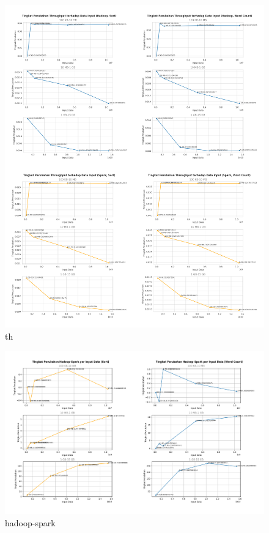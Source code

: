 \begin{figure}[h]
    \centering
    \includegraphics[width=1.1\textwidth]{figures/ch04/3-grup-th.png}
    \caption{th}
    \label{fig:3-grup-th}
\end{figure}

\begin{figure}[h]
    \centering
    \includegraphics[width=1.1\textwidth]{figures/ch04/3-grup-hadoop-spark.png}
    \caption{hadoop-spark}
    \label{fig:3-grup-hadoop-spark}
\end{figure}


